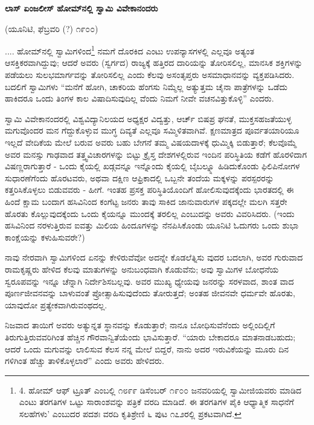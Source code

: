 \begin{center}
\textbf{ಲಾಸ್ ಏಂಜಲೀಸ್ ಹೋಮ್​ನಲ್ಲಿ ಸ್ವಾಮಿ ವಿವೇಕಾನಂದರು}
\end{center}

\begin{center}
(ಯೂನಿಟಿ, ಫೆಬ್ರವರಿ (?) ೧೯೦೦)
\end{center}

.... ಹೋಮ್​ನಲ್ಲಿ ಸ್ವಾಮಿಗಳಿಂದ\footnote{4. ಹೋಮ್​ ಆಫ್ ಟ್ರೂತ್ ಎಂಬಲ್ಲಿ ೧೮೯೯ ಡಿಸೆಂಬರ್ ೧೯೦೦ ಜನವರಿಯಲ್ಲಿ ಸ್ವಾಮೀಜಿಯವರು ಮಾಡಿದ ಎಂಟು ತರಗತಿಗಳ ಒಟ್ಟು ಸಾರಾಂಶವನ್ನು ಪತ್ರಿಕೆ ವರದಿ ಮಾಡಿದೆ. ಈ ತರಗತಿಗಳ ಪೈಕಿ ಆಧ್ಯಾತ್ಮಿಕ ಸಾಧನೆಗೆ ಸಲಹೆಗಳು’ ಎಂಬುದರ ಪದಶಃ ವರದಿ ಕೃತಿಶ್ರೇಣಿ ೬ ಪುಟ ೧೭೨ರಲ್ಲಿ ಪ್ರಕಟವಾಗಿದೆ.} ನಮಗೆ ದೊರಕಿದ ಎಂಟು ಉಪನ್ಯಾಸಗಳಲ್ಲಿ ಎಲ್ಲವೂ ಅತ್ಯಂತ ಆಸಕ್ತಿಕರವಾಗಿದ್ದುವು; ಆದರೆ ಅವರು (ಸ್ವರ್ಗದ) ರಾಜ್ಯಕ್ಕೆ ಹತ್ತಿರದ ದಾರಿಯನ್ನು ತೋರಿಸಲಿಲ್ಲ, ಮಾನಸಿಕ ಶಕ್ತಿಗಳನ್ನು ಪಡೆಯಲು ಸುಲಭಮಾರ್ಗವನ್ನು ತೋರಿಸಲಿಲ್ಲ ಎಂದು ಕೆಲವು ಅಸಂತೃಪ್ತರು ಅಸಮಾಧಾನವನ್ನು ವ್ಯಕ್ತಪಡಿಸಿದರು. ಬದಲಿಗೆ ಸ್ವಾಮಿಗಳು “ಮನೆಗೆ ಹೋಗಿ, ಚಾಕರಿಯ ಹೆಂಗಸು ನಿಮ್ಮೆಲ್ಲ ಅತ್ಯುತ್ತಮ ಚೈನಾ ಪಾತ್ರೆಗಳನ್ನು ಒಡೆದು ಹಾಕಿದರೂ ಒಂದು ತಿಂಗಳ ಕಾಲ ವಿಷಾದಿಸುವುದಿಲ್ಲ ವೆಂದು ನಿಮಗೆ ನೀವೇ ವಚನವಿತ್ತುಕೊಳ್ಳಿ” ಎಂದರು.

ಸ್ವಾಮಿ ವಿವೇಕಾನಂದರಲ್ಲಿ ವಿಶ್ವವಿದ್ಯಾನಿಲಯದ ಅಧ್ಯಕ್ಷರ ವಿದ್ವತ್ತು, ಆರ್ಚ್ ಬಿಷಪ್ರ ಘನತೆ, ಮುಕ್ತಸಹಜತೆಯುಳ್ಳ ಮಗುವೊಂದರ ಮನ ಗೆದ್ದುಕೊಳ್ಳುವ ಮುಗ್ಧ ದಿವ್ಯತೆ ಎಲ್ಲವೂ ಸಮ್ಮಿಳಿತವಾಗಿವೆ. ಕ್ಷಣಮಾತ್ರದ ಪೂರ್ವತಯಾರಿಯೂ ಇಲ್ಲದೆ ವೇದಿಕೆಯ ಮೇಲೆ ಬರುವ ಅವರು ಬಹು ಬೇಗನೆ ತಮ್ಮ ವಿಷಯದಾಳಕ್ಕೆ ಧುಮ್ಮಿಕ್ಕಿ ಬಿಡುತ್ತಾರೆ; ಕೆಲವೊಮ್ಮೆ ಅವರ ಮನಸ್ಸು ಗಾಢವಾದ ತತ್ತ್ವವಿಚಾರಗಳನ್ನು ಬಿಟ್ಟು ಕ್ರೈಸ್ತ ದೇಶಗಳಲ್ಲಿರುವ ಇಂದಿನ ಪರಿಸ್ಥಿತಿಯ ಕಡೆಗೆ ಹೊರಳಿದಾಗ ವಿಷಣ್ಣರಾಗುತ್ತಾರೆ - ಒಂದು ಕೈಯಲ್ಲಿ ಖಡ್ಗವನ್ನೂ ಇನ್ನೊಂದು ಕೈಯಲ್ಲಿ ಬೈಬಲ್ನ್ನೂ ಹಿಡಿದುಕೊಂಡು ಫಿಲಿಪಿನೋಗಳ ಸುಧಾರಣೆಗೆಂದು ಹೊರಟವರು, ಅಥವಾ ದಕ್ಷಿಣ ಆಫ್ರಿಕಾದಲ್ಲಿ ಒಬ್ಬನೇ ತಂದೆಯ ಮಕ್ಕಳನ್ನು ಪರಸ್ಪರರನ್ನು ಕತ್ತರಿಸಿಕೊಳ್ಳಲು ಬಿಡುವವರು - ಹೀಗೆ. ಇಂತಹ ಪ್ರಸಕ್ತ ಪರಿಸ್ಥಿತಿಯೊಂದಿಗೆ ಹೋಲಿಸುವುದಕ್ಕೆಂದು ಭಾರತದಲ್ಲಿ ಈ ಹಿಂದೆ ಕ್ಷಾಮ ಬಂದಾಗ ಹಸಿವಿನಿಂದ ಕಂಗೆಟ್ಟ ಜನರು ತಾವು ಸಾಕಿದ ಜಾನುವಾರುಗಳ ಪಕ್ಕದಲ್ಲೇ ಮಲಗಿ ಸತ್ತರೇ ಹೊರತು ಕೊಲ್ಲುವುದಕ್ಕೆಂದು ಒಂದು ಕೈಯನ್ನೂ ಮುಂದಕ್ಕೆ ತರಲಿಲ್ಲ ಎಂಬುದನ್ನು ಅವರು ವಿವರಿಸಿದರು. (ಇಂದು ಹಸಿವಿನಿಂದ ನರಳುತ್ತಿರುವ ಐವತ್ತು ಮಿಲಿಯ ಹಿಂದೂಗಳನ್ನು ನೆನಪಿಸಿಕೊಂಡು ಯೂನಿಟಿ ಓದುಗರು ಒಂದು ಶುಭಾ ಕಾಂಕ್ಷೆಯನ್ನು ಕಳುಹಿಸುವರೇ?)

ನಾವು ನೇರವಾಗಿ ಸ್ವಾಮಿಗಳಿಂದ ಏನನ್ನು ಕೇಳಿರುವೆವೋ ಅದನ್ನೇ ಕೊಡಲೆತ್ನಿಸು ವುದರ ಬದಲಾಗಿ, ಅವರ ಗುರುವಾದ ರಾಮಕೃಷ್ಣರು ಹೇಳಿದ ಕೆಲವು ಮಾತುಗಳನ್ನು ಅನುಬಂಧವಾಗಿ ಕೊಡುವೆನು; ಅವು ಸ್ವಾಮಿಗಳ ಬೋಧನೆಯ ಸ್ವರೂಪವನ್ನು ಇನ್ನೂ ಚೆನ್ನಾಗಿ ನಿರ್ದೇಶಿಸಬಲ್ಲವು. ಅವರ ಮುಖ್ಯ ಧ್ಯೇಯವು ಜನರನ್ನು ಸರಳವಾದ, ಶಾಂತ ವಾದ ಪೂರ್ಣಜೀವನವನ್ನು ಬಾಳುವಂತೆ ಪ್ರೋತ್ಸಾಹಿಸುವುದೆಂದು ತೋರುತ್ತದೆ; ಅಂತಹ ಜೀವನವೇ ಧರ್ಮವೇ ಹೊರತು, ಯಾವುದೋ ಪ್ರತ್ಯೇಕವಾಗಿರುವಂಥದಲ್ಲ.

ನಿಜವಾದ ತಾಯಿಗೆ ಅವರು ಅತ್ಯುನ್ನತ ಸ್ಥಾನವನ್ನು ಕೊಡುತ್ತಾರೆ; ನಾನೂ ಬೋಧಿಸುವೆನೆಂದು ಅಲ್ಲಿಂದಿಲ್ಲಿಗೆ ತಿರುಗುತ್ತಿರುವವರಿಗಿಂತ ಹೆಚ್ಚಿನ ಗೌರವಾನ್ವಿತೆಯೆಂದು ಭಾವಿಸುತ್ತಾರೆ. “ಯಾರು ಬೇಕಾದರೂ ಮಾತನಾಡಬಹುದು; ಆದರೆ ಒಂದು ಮಗುವನ್ನು ಲಾಲಿಸುವ ಕೆಲಸ ನನ್ನ ಮೇಲೆ ಬಿದ್ದರೆ, ನಾನು ಅದರ ಇರುವಿಕೆಯನ್ನು ಮೂರು ದಿನ ಗಳಿಗಿಂತ ಹೆಚ್ಚು ತಾಳಿಕೊಳ್ಳಲಾರೆ” ಎಂದು ಅವರು ಹೇಳಿದರು.

